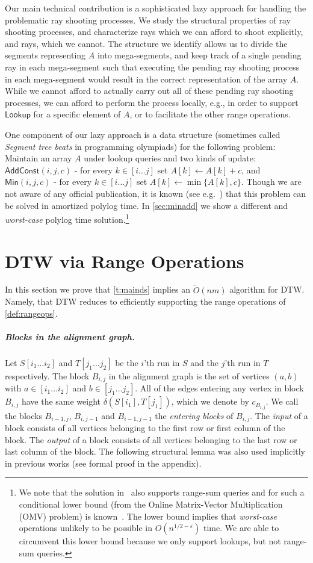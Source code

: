 \documentclass[a4paper,UKenglish,cleveref, autoref, thm-restate]{lipics-v2021}
\newcommand{\local}{\text{short }}
\newcommand{\longrange}{\text{long }}
\newcommand{\Lookup}{\mathsf{Lookup}}
\newcommand{\Add}{\mathsf{AddConst}}
\newcommand{\Min}{\mathsf{Min}}
\newcommand{\para}[1]{\vspace{-0.1in} \subparagraph*{#1}}
\begin{document}
Our main technical contribution is a sophisticated lazy approach for handling the problematic ray shooting processes. 
We study the structural properties of ray shooting processes, and characterize \longrange rays which we can afford to shoot explicitly, and \local rays, which we cannot. The structure we identify allows us to divide the segments representing $A$ into mega-segments, and keep track of a single pending \local ray in each mega-segment such that executing the pending ray shooting process in each mega-segment would result in the correct representation of the array $A$. While we cannot afford to actually carry out all of these pending ray shooting processes, we can afford to perform the process locally, e.g., in order to support $\Lookup$ for a specific element of $A$, or to facilitate the other range operations. 

One component of our lazy approach is a data structure (sometimes called {\em Segment tree beats} in programming olympiads) for the following problem: Maintain an array $A$ under lookup queries and two kinds of update: $\Add(i,j,c)$ - for every $k\in [i\ldots j]$ set $A[k] \leftarrow A[k]+c$, and $\Min(i,j,c)$ - for every $k\in [i\ldots j]$ set $A[k] \leftarrow \min\{A[k],c\}$. Though we are not aware of any official publication, it is known (see e.g.~\cite{beats}) that this problem can be solved in amortized polylog time. In \cref{sec:minadd} we show a different and {\em worst-case} polylog time solution.\footnote{We note that the solution in~\cite{beats} also supports range-sum queries and for such a conditional lower bound (from the Online Matrix-Vector Multiplication (OMV) problem) is  known~\cite{Private}. The lower bound implies that {\em worst-case} operations unlikely to be possible in $O(n^{1/2-\varepsilon})$ time. 
We are able to circumvent this lower bound because we only support lookups, but not range-sum queries. 
}

\section{DTW via Range Operations}
\label{sec:DTWtoRanges}

In this section we prove that \cref{t:mainds} implies an $\tilde O(nm)$ algorithm for DTW. Namely, that DTW reduces to efficiently supporting the range operations of \cref{def:rangeops}.

\para{Blocks in the alignment graph.}
Let $S[i_1 \ldots i_2]$ and $T[j_1 \ldots j_2]$ be the $i$'th run in $S$ and the $j$'th run in $T$ respectively. 
The block $B_{i,j}$ in the alignment graph is the set of vertices $(a,b)$ with $a\in [i_1 \ldots i_2]$ and $b\in [j_1 \ldots j_2]$.
All of the edges entering any vertex in block $B_{i,j}$ have the same weight $\delta(S[i_1],T[j_1])$, which we denote by $c_{B_{i,j}}$. 
We call the blocks $B_{i-1,j}$, $B_{i,j-1}$ and $B_{i-1,j-1}$ the {\em entering blocks} of $B_{i,j}$. The {\em input} of a block consists of all vertices belonging to the first row or first column of the block. The {\em output} of a block consists of all vertices belonging to the last row or last column of the block. The following structural lemma was also used implicitly in previous works (see formal proof in the appendix). 
\end{document}
